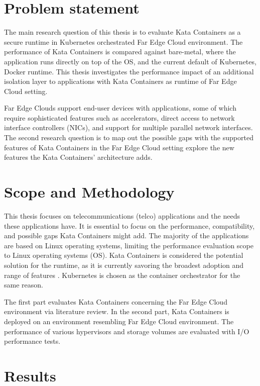 \section{Problem statement}
\label{section:intro_problemstatement}

The main research question of this thesis is to evaluate Kata Containers as a secure runtime in Kubernetes orchestrated Far Edge Cloud environment. The performance of Kata Containers is compared against bare-metal, where the application runs directly on top of the OS, and the current default of Kubernetes, Docker runtime. This thesis investigates the performance impact of an additional isolation layer to applications with Kata Containers as runtime of Far Edge Cloud setting.

Far Edge Clouds support end-user devices with applications, some of which require sophisticated features such as accelerators, direct access to network interface controllers (NICs), and support for multiple parallel network interfaces. The second research question is to map out the possible gaps with the supported features of Kata Containers in the Far Edge Cloud setting explore the new features the Kata Containers' architecture adds.

\section{Scope and Methodology}
\label{section:intro_scopemethodology}

This thesis focuses on telecommunications (telco) applications and the needs these applications have. It is essential to focus on the performance, compatibility, and possible gaps Kata Containers might add. The majority of the applications are based on Linux operating systems, limiting the performance evaluation scope to Linux operating systems (OS). Kata Containers is considered the potential solution for the runtime, as it is currently savoring the broadest adoption and range of features \cite{Flauzac2020}. Kubernetes is chosen as the container orchestrator for the same reason.

The first part evaluates Kata Containers concerning the Far Edge Cloud environment via literature review. In the second part, Kata Containers is deployed on an environment resembling Far Edge Cloud environment. The performance of various hypervisors and storage volumes are evaluated with I/O performance tests.

\section{Results}
\label{section:intro_results}

